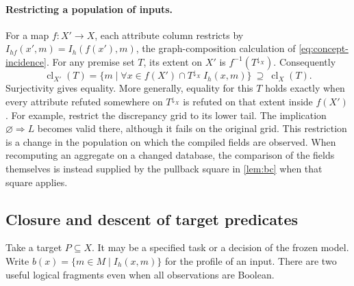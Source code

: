 \documentclass[11pt,a4paper]{article}
\theoremstyle{definition}
\theoremstyle{remark}\newaliascnt{remark}{theorem}
\numberwithin{equation}{section}
\begin{document}
\paragraph{Restricting a population of inputs.}
For a map $f:X'\to X$, each attribute column restricts by $I_{h f}(x',m)=I_h(f(x'),m)$, the graph-composition calculation of \eqref{eq:concept-incidence}. For any premise set $T$, its extent on $X'$ is $f^{-1}(T^{\downarrow_X})$. Consequently
\[
 \operatorname{cl}_{X'}(T)=
 \{m\mid \forall x\in f(X')\cap T^{\downarrow_X}\ I_h(x,m)\}
 \ \supseteq\ \operatorname{cl}_X(T).
\]
Surjectivity gives equality. More generally, equality for this $T$ holds exactly when every attribute refuted somewhere on $T^{\downarrow_X}$ is refuted on that extent inside $f(X')$. For example, restrict the discrepancy grid to its lower tail. The implication $\varnothing\Rightarrow L$ becomes valid there, although it fails on the original grid. This restriction is a change in the population on which the compiled fields are observed. When recomputing an aggregate on a changed database, the comparison of the fields themselves is instead supplied by the pullback square in \cref{lem:bc} when that square applies.

\subsection{Closure and descent of target predicates}
Take a target $P\subseteq X$. It may be a specified task or a decision of the frozen model. Write $b(x)=\{m\in M\mid I_h(x,m)\}$ for the profile of an input. There are two useful logical fragments even when all observations are Boolean.
\end{document}
